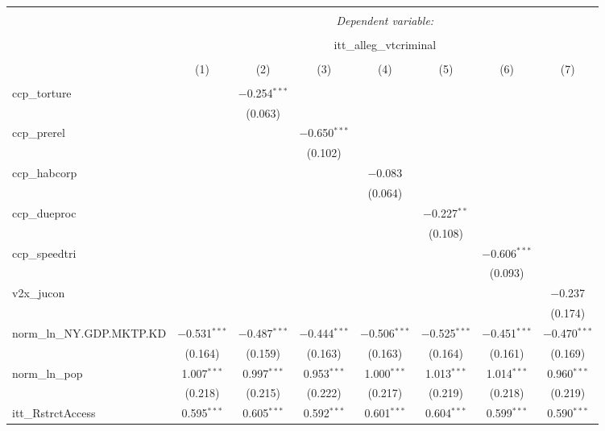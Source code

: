 
\begin{sidewaystable}[!htbp] \centering 
  \caption{} 
  \label{} 
\tiny 
\begin{tabular}{@{\extracolsep{5pt}}lccccccc} 
\\[-1.8ex]\hline 
\hline \\[-1.8ex] 
 & \multicolumn{7}{c}{\textit{Dependent variable:}} \\ 
\cline{2-8} 
\\[-1.8ex] & \multicolumn{7}{c}{itt\_alleg\_vtcriminal} \\ 
\\[-1.8ex] & (1) & (2) & (3) & (4) & (5) & (6) & (7)\\ 
\hline \\[-1.8ex] 
 ccp\_torture &  & $-$0.254$^{***}$ &  &  &  &  &  \\ 
  &  & (0.063) &  &  &  &  &  \\ 
  ccp\_prerel &  &  & $-$0.650$^{***}$ &  &  &  &  \\ 
  &  &  & (0.102) &  &  &  &  \\ 
  ccp\_habcorp &  &  &  & $-$0.083 &  &  &  \\ 
  &  &  &  & (0.064) &  &  &  \\ 
  ccp\_dueproc &  &  &  &  & $-$0.227$^{**}$ &  &  \\ 
  &  &  &  &  & (0.108) &  &  \\ 
  ccp\_speedtri &  &  &  &  &  & $-$0.606$^{***}$ &  \\ 
  &  &  &  &  &  & (0.093) &  \\ 
  v2x\_jucon &  &  &  &  &  &  & $-$0.237 \\ 
  &  &  &  &  &  &  & (0.174) \\ 
  norm\_ln\_NY.GDP.MKTP.KD & $-$0.531$^{***}$ & $-$0.487$^{***}$ & $-$0.444$^{***}$ & $-$0.506$^{***}$ & $-$0.525$^{***}$ & $-$0.451$^{***}$ & $-$0.470$^{***}$ \\ 
  & (0.164) & (0.159) & (0.163) & (0.163) & (0.164) & (0.161) & (0.169) \\ 
  norm\_ln\_pop & 1.007$^{***}$ & 0.997$^{***}$ & 0.953$^{***}$ & 1.000$^{***}$ & 1.013$^{***}$ & 1.014$^{***}$ & 0.960$^{***}$ \\ 
  & (0.218) & (0.215) & (0.222) & (0.217) & (0.219) & (0.218) & (0.219) \\ 
  itt\_RstrctAccess & 0.595$^{***}$ & 0.605$^{***}$ & 0.592$^{***}$ & 0.601$^{***}$ & 0.604$^{***}$ & 0.599$^{***}$ & 0.590$^{***}$ \\ 

\end{tabular}
\end{sidewaystable}
